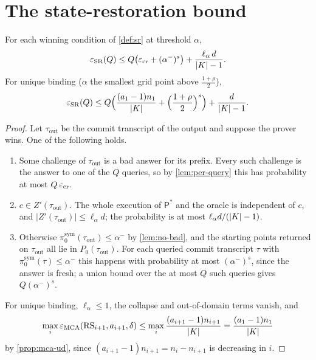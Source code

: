 \section{The state-restoration bound}

\begin{theorem}\label{thm:sr-binding}
For each winning condition of \cref{def:sr} at threshold $\alpha$,
\[
\varepsilon_{\mathrm{SR}}(Q)\le Q\bigl(\varepsilon_{\mathrm{cr}}+(\alpha^-)^s\bigr)+\frac{\ell_\alpha\,d}{|K|-1}.
\]
For unique binding ($\alpha$ the smallest grid point above $\frac{1+\rho}2$),
\[
\varepsilon_{\mathrm{SR}}(Q)\le Q\Bigl(\frac{(a_1-1)n_1}{|K|}+\Bigl(\frac{1+\rho}2\Bigr)^s\Bigr)+\frac{d}{|K|-1}.
\]
\end{theorem}

\begin{proof}
Let $\tau_{\mathrm{out}}$ be the commit transcript of the output and suppose the prover
wins. One of the following holds.
\begin{enumerate}[label=\textup{(\alph*)}]
\item Some challenge of $\tau_{\mathrm{out}}$ is a bad answer for its prefix. Every such
challenge is the answer to one of the $Q$ queries, so by \cref{lem:per-query} this has
probability at most $Q\,\varepsilon_{\mathrm{cr}}$.
\item $c\in Z'(\tau_{\mathrm{out}})$. The whole execution of $\mathsf P^\ast$ and the oracle
is independent of $c$, and $|Z'(\tau_{\mathrm{out}})|\le\ell_\alpha d$; the probability is
at most $\ell_\alpha d/(|K|-1)$.
\item Otherwise $\pi^{\mathrm{sym}}_0(\tau_{\mathrm{out}})\le\alpha^-$ by \cref{lem:no-bad},
and the starting points returned on $\tau_{\mathrm{out}}$ all lie in
$P_0(\tau_{\mathrm{out}})$. For each queried commit transcript $\tau$ with
$\pi^{\mathrm{sym}}_0(\tau)\le\alpha^-$ this happens with probability at most
$(\alpha^-)^s$, since the answer is fresh; a union bound over the at most $Q$ such queries
gives $Q(\alpha^-)^s$.
\end{enumerate}
For unique binding, $\ell_\alpha\le1$, the collapse and out-of-domain terms vanish, and
\[
\max_i\varepsilon_{\mathrm{MCA}}(\mathrm{RS}_{i+1},a_{i+1},\delta)\le\max_i\frac{(a_{i+1}-1)n_{i+1}}{|K|}=\frac{(a_1-1)n_1}{|K|}
\]
by \cref{prop:mca-ud}, since $(a_{i+1}-1)n_{i+1}=n_i-n_{i+1}$ is decreasing in $i$.
\end{proof}

